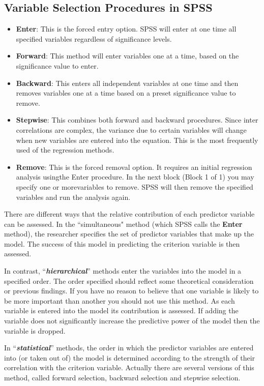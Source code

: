 \documentclass[a4paper,12pt]{article}
\begin{document}
\subsection{Variable Selection Procedures in SPSS}

\begin{itemize}
	\item \textbf{Enter}: This is the forced entry option. SPSS will enter at one time all specified variables regardless of significance levels.
	\item \textbf{Forward}: This method will enter variables one at a time, based on the significance value to enter.
	\item \textbf{Backward}: This enters all independent variables at one time and then removes variables one at a time based on a preset significance value to remove.
	\item \textbf{Stepwise}: This combines both forward and backward procedures. Since inter correlations are complex, the variance due to certain variables will change when new variables are entered into the equation. This is the most frequently used of the regression methods.
	\item \textbf{Remove}: This is the forced removal option. It requires an initial regression analysis usingthe Enter procedure. In the next block (Block 1 of 1) you may specify one or morevariables to remove. SPSS will then remove the specified variables and run the analysis again.
\end{itemize}

There are different ways that the relative contribution of each predictor variable can be assessed. In the ``simultaneous" method (which SPSS calls the \textbf{Enter} method), the researcher specifies the set of predictor variables that make up the model. The success of this model in predicting the criterion variable is then assessed.

In contrast, “\textbf{\textit{hierarchical}}” methods enter the variables into the model in a specified order. The order specified should reflect some theoretical consideration or previous
findings. If you have no reason to believe that one variable is likely to be more important than another you should not use this method. As each variable is entered into the model its contribution is assessed. If adding the variable does not significantly increase the predictive power of the model then the variable is
dropped.

In “\textbf{\textit{statistical}}” methods, the order in which the predictor variables are entered into (or taken out of) the model is determined according to the strength of their correlation with the criterion variable. Actually there are several versions of this method, called forward selection, backward selection and stepwise selection.
\end{document}
